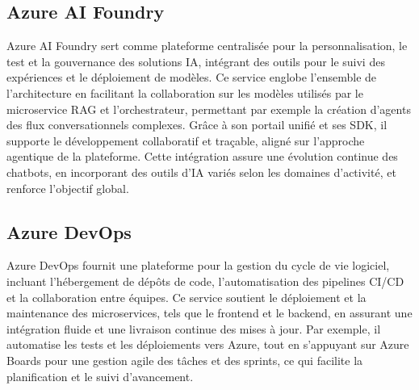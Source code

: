 \subsection{Azure AI Foundry}
Azure AI Foundry \cite{azure-ai-foundry} sert comme plateforme centralisée pour la personnalisation, le test et la gouvernance des solutions IA, intégrant des outils pour le suivi des expériences et le déploiement de modèles. Ce service englobe l'ensemble de l'architecture en facilitant la collaboration sur les modèles utilisés par le microservice RAG et l'orchestrateur, permettant par exemple la création d'agents des flux conversationnels complexes. Grâce à son portail unifié et ses SDK, il supporte le développement collaboratif et traçable, aligné sur l'approche agentique de la plateforme. Cette intégration assure une évolution continue des chatbots, en incorporant des outils d'IA variés selon les domaines d'activité, et renforce l'objectif global.

\subsection{Azure DevOps}
Azure DevOps \cite{azure-devops-docs} fournit une plateforme pour la gestion du cycle de vie logiciel, incluant l'hébergement de dépôts de code, l'automatisation des pipelines CI/CD et la collaboration entre équipes. Ce service soutient le déploiement et la maintenance des microservices, tels que le frontend et le backend, en assurant une intégration fluide et une livraison continue des mises à jour. Par exemple, il automatise les tests et les déploiements vers Azure, tout en s'appuyant sur Azure Boards \cite{azure-boards-docs} pour une gestion agile des tâches et des sprints, ce qui facilite la planification et le suivi d'avancement.

